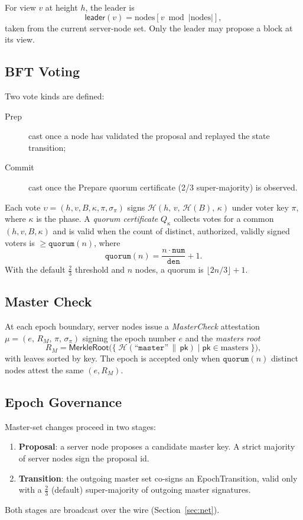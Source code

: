\documentclass[11pt,a4paper]{article}
\theoremstyle{definition}
\newcommand{\pk}{\textsf{pk}}
\newcommand{\EpochTransition}{\textsf{EpochTransition}}
\newcommand{\hash}{\mathcal{H}}
\begin{document}
For view $v$ at height $h$, the leader is
\[
\mathsf{leader}(v) = \mathrm{nodes}[v \bmod |\mathrm{nodes}|],
\]
taken from the current server-node set.  Only the leader may propose a block at
its view.

\subsection{BFT Voting}

Two vote kinds are defined:

\begin{description}
  \item[Prep] cast once a node has validated the proposal and
    replayed the state transition;
  \item[Comm\text{}it] cast once the Prepare quorum certificate (2/3 super-majority)
    is observed.
\end{description}

Each vote $\upsilon = (h, v, B, \kappa, \pi, \sigma_\pi)$ signs
$\hash(h,\,v,\,\hash(B),\,\kappa)$ under voter key $\pi$, where $\kappa$ is the
phase.  A \emph{quorum certificate} $Q_\kappa$ collects votes for a common
$(h,v,B,\kappa)$ and is valid when the count of distinct, authorized, validly
signed voters is $\ge \texttt{quorum}(n)$, where
\[
\texttt{quorum}(n) = \frac{n\cdot\texttt{num}}{\texttt{den}} + 1.
\]
With the default $\frac{2}{3}$ threshold and $n$ nodes, a quorum is
$\lfloor 2n/3\rfloor + 1$.

\subsection{Master Check}

At each epoch boundary, server nodes issue a \emph{MasterCheck} attestation
$\mu = (e,\, R_M,\, \pi,\, \sigma_\pi)$ signing the epoch number $e$ and the
\emph{masters root}
\[
R_M = \mathsf{MerkleRoot}\bigl(\{\;\hash(\texttt{``master''}\,\|\,\pk)\;|\;\pk\in\mathrm{masters}\;\}\bigr),
\]
with leaves sorted by key.  The epoch is accepted only when
$\texttt{quorum}(n)$ distinct nodes attest the same $(e, R_M)$.

\subsection{Epoch Governance}
\label{sec:epoch-gov}

Master-set changes proceed in two stages:
\begin{enumerate}[label=(\arabic*),leftmargin=2em]
  \item \textbf{Proposal}: a server node proposes a candidate master key.
    A strict majority of server nodes sign the proposal id.
  \item \textbf{Transition}: the outgoing master set co-signs an
    \EpochTransition, valid only with a $\frac{2}{3}$ (default) super-majority
    of outgoing master signatures.
\end{enumerate}
Both stages are broadcast over the wire (Section~\ref{sec:net}).
\end{document}
